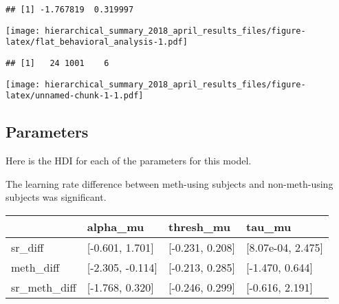 \documentclass[]{article}
\begin{document}
\begin{verbatim}
## [1] -1.767819  0.319997
\end{verbatim}

\texttt{[image: hierarchical\_summary\_2018\_april\_results\_files/figure-latex/flat\_behavioral\_analysis-1.pdf]}

\begin{verbatim}
## [1]   24 1001    6
\end{verbatim}

\texttt{[image: hierarchical\_summary\_2018\_april\_results\_files/figure-latex/unnamed-chunk-1-1.pdf]}

\subsection{Parameters}\label{parameters}

Here is the HDI for each of the parameters for this model.

The learning rate difference between meth-using subjects and
non-meth-using subjects was significant.

\begin{longtable}[]{@{}llll@{}}
\toprule
& alpha\_mu & thresh\_mu & tau\_mu\tabularnewline
\midrule
\endhead
sr\_diff & {[}-0.601, 1.701{]} & {[}-0.231, 0.208{]} & {[}8.07e-04,
2.475{]}\tabularnewline
meth\_diff & {[}-2.305, -0.114{]} & {[}-0.213, 0.285{]} & {[}-1.470,
0.644{]}\tabularnewline
sr\_meth\_diff & {[}-1.768, 0.320{]} & {[}-0.246, 0.299{]} & {[}-0.616,
2.191{]}\tabularnewline
\bottomrule
\end{longtable}
\end{document}
